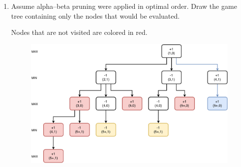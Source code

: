\documentclass[9pt,a4paper]{extarticle}
\newenvironment{solution}
    {%
    \color{red}
    }
    { 
    \color{black}
    }
\begin{document}
\begin{enumerate}
\begin{enumerate}
        \item Assume alpha–beta pruning were applied in optimal order. Draw the game tree containing only the nodes that would be evaluated.
        
        \begin{solution}
            Nodes that are not visited are colored in red.
            \begin{figure}[h]
                \centering
                \includegraphics[width=.775\textwidth]{figures/tree_game_marked-alpha.pdf}
            \end{figure}
        \end{solution}
    \end{enumerate}
\end{enumerate}
   
\end{document}
